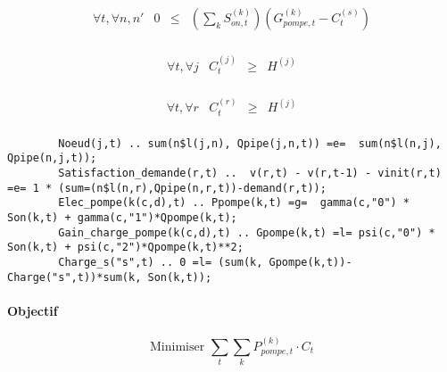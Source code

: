 \documentclass{article}
\begin{document}
\begin{equation}
    \tag{Charge source}
    \left.
        \begin{array}{lcccc}
            \forall t, \forall n,n'   &   0 & \leq & (\sum_k S_{on,t}^{(k)})    (G_{pompe,t}^{(k)}-C_t^{(s)})\\[0.2cm]
        \end{array}
    \right.
\end{equation}

\begin{equation}
    \tag{Charge jonction}
    \left.
        \begin{array}{lcccc}
            \forall t, \forall j   &   C_t^{(j)}    & \geq &   H^{(j)}\\[0.2cm]
        \end{array}
    \right.
\end{equation}

\begin{equation}
    \tag{Charge réservoire}
    \left.
        \begin{array}{lcccc}
            \forall t, \forall r   &   C_t^{(r)}    & \geq &   H^{(j)}\\[0.2cm]
        \end{array}
    \right.
\end{equation}
    
\begin{adjustbox}{max width=\textwidth}
    \begin{lstlisting}
        Noeud(j,t) .. sum(n$l(j,n), Qpipe(j,n,t)) =e=  sum(n$l(n,j), Qpipe(n,j,t));
        Satisfaction_demande(r,t) ..  v(r,t) - v(r,t-1) - vinit(r,t) =e= 1 * (sum=(n$l(n,r),Qpipe(n,r,t))-demand(r,t));
        Elec_pompe(k(c,d),t) .. Ppompe(k,t) =g=  gamma(c,"0") * Son(k,t) + gamma(c,"1")*Qpompe(k,t);
        Gain_charge_pompe(k(c,d),t) .. Gpompe(k,t) =l= psi(c,"0") * Son(k,t) + psi(c,"2")*Qpompe(k,t)**2;
        Charge_s("s",t) .. 0 =l= (sum(k, Gpompe(k,t))-Charge("s",t))*sum(k, Son(k,t));
    \end{lstlisting}
\end{adjustbox}

\paragraph{Objectif}
$$
    \text{Minimiser }   \sum_t \sum_k P_{pompe,t}^{(k)}\cdot C_t
$$
\end{document}
